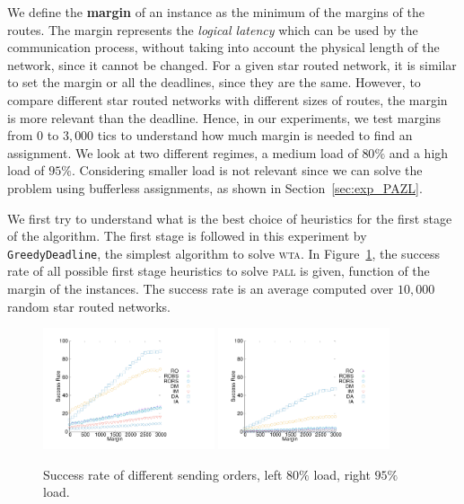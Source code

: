 \documentclass[a4paper,10pt]{article}
\newcommand\greedydeadline{\texttt{GreedyDeadline}\xspace}
\newcommand\pall{\textsc{pall}\xspace}
\newcommand\wta{\textsc{wta}\xspace}
\begin{document}
    We define the {\bf margin} of an instance as the minimum of the margins of the routes. The margin represents the \emph{logical latency} which can be used by the communication process, without taking into account the physical length of the network, since it cannot be changed. For a given star routed network, it is similar to set the margin or all the deadlines, since they are the same. However, to compare different star routed networks with different sizes of routes, the margin is more relevant than the deadline. Hence, in our experiments, we test margins from $0$ to $3,000$ tics to understand how much margin is needed to find an assignment.
   	We look at two different regimes, a medium load of $80\%$ and a high load of $95\%$.
   	Considering smaller load is not relevant since we can solve the problem using bufferless assignments, as shown in Section~\ref{sec:exp_PAZL}. 
   
   	We first try to understand what is the best choice of heuristics for the first stage of the algorithm. The first stage is followed in this experiment by \greedydeadline, the simplest algorithm to solve \wta. In Figure~\ref{fig:success1random}, the success rate of all possible first stage heuristics to solve \pall is given, function of the margin of the instances. The success rate is an average computed over $10,000$ random star routed networks. 
   

 
\begin{figure}[h] 
  \centering
          \includegraphics[width=0.45\textwidth]{departs_gp_250001.pdf}
           \includegraphics[width=0.45\textwidth]{departs_gp_210001.pdf}
      \caption{Success rate of different sending orders, left $80\%$ load, right $95\%$ load.}
           \label{fig:success1random}
     \end{figure}
\end{document}
